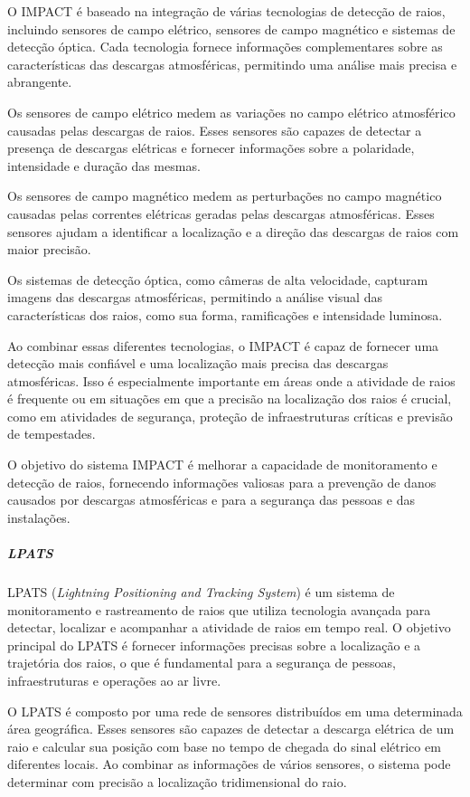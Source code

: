 \documentclass[a4paper, 12pt, onecolumn,singlespacing]{article}
\begin{document}
	O IMPACT é baseado na integração de várias tecnologias de detecção de raios, incluindo sensores de campo elétrico, sensores de campo magnético e sistemas de detecção óptica. Cada tecnologia fornece informações complementares sobre as características das descargas atmosféricas, permitindo uma análise mais precisa e abrangente.
	
	Os sensores de campo elétrico medem as variações no campo elétrico atmosférico causadas pelas descargas de raios. Esses sensores são capazes de detectar a presença de descargas elétricas e fornecer informações sobre a polaridade, intensidade e duração das mesmas.
	
	Os sensores de campo magnético medem as perturbações no campo magnético causadas pelas correntes elétricas geradas pelas descargas atmosféricas. Esses sensores ajudam a identificar a localização e a direção das descargas de raios com maior precisão.
	
	Os sistemas de detecção óptica, como câmeras de alta velocidade, capturam imagens das descargas atmosféricas, permitindo a análise visual das características dos raios, como sua forma, ramificações e intensidade luminosa.
	
	Ao combinar essas diferentes tecnologias, o IMPACT é capaz de fornecer uma detecção mais confiável e uma localização mais precisa das descargas atmosféricas. Isso é especialmente importante em áreas onde a atividade de raios é frequente ou em situações em que a precisão na localização dos raios é crucial, como em atividades de segurança, proteção de infraestruturas críticas e previsão de tempestades.
	
	O objetivo do sistema IMPACT é melhorar a capacidade de monitoramento e detecção de raios, fornecendo informações valiosas para a prevenção de danos causados por descargas atmosféricas e para a segurança das pessoas e das instalações.
	
	\subparagraph{LPATS}
	
	LPATS (\textit{Lightning Positioning and Tracking System}) é um sistema de monitoramento e rastreamento de raios que utiliza tecnologia avançada para detectar, localizar e acompanhar a atividade de raios em tempo real. O objetivo principal do LPATS é fornecer informações precisas sobre a localização e a trajetória dos raios, o que é fundamental para a segurança de pessoas, infraestruturas e operações ao ar livre.
	
	O LPATS é composto por uma rede de sensores distribuídos em uma determinada área geográfica. Esses sensores são capazes de detectar a descarga elétrica de um raio e calcular sua posição com base no tempo de chegada do sinal elétrico em diferentes locais. Ao combinar as informações de vários sensores, o sistema pode determinar com precisão a localização tridimensional do raio.
	
\end{document}
